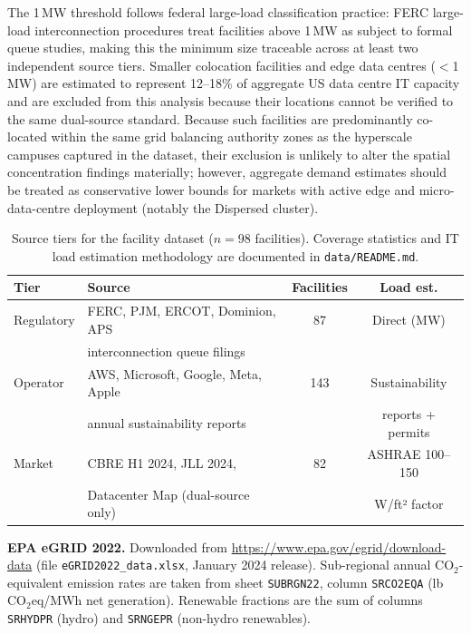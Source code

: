 \documentclass[preprint,12pt]{elsarticle}
\begin{document}
The 1\,MW threshold follows federal large-load classification practice: FERC
large-load interconnection procedures treat facilities above 1\,MW as subject
to formal queue studies, making this the minimum size traceable across at least
two independent source tiers. Smaller colocation facilities and edge data
centres ($<$1\,MW) are estimated to represent 12--18\% of aggregate US data
centre IT capacity \cite{shehabi2024lbnl} and are excluded from this analysis
because their locations cannot be verified to the same dual-source standard.
Because such facilities are predominantly co-located within the same grid
balancing authority zones as the hyperscale campuses captured in the dataset,
their exclusion is unlikely to alter the spatial concentration findings
materially; however, aggregate demand estimates should be treated as
conservative lower bounds for markets with active edge and micro-data-centre
deployment (notably the Dispersed cluster).

\begin{table}[htbp]
\centering
\caption{Source tiers for the facility dataset ($n=98$ facilities).
Coverage statistics and IT load estimation methodology are documented
in \texttt{data/README.md}.}
\label{tab:dataset_tiers}
\small
\begin{tabular}{@{}p{2.2cm}p{5.2cm}cc@{}}
\toprule
\textbf{Tier} & \textbf{Source} & \textbf{Facilities} & \textbf{Load est.} \\
\midrule
Regulatory & FERC, PJM, ERCOT, Dominion, APS & 87 & Direct (MW) \\
            & interconnection queue filings & & \\
Operator   & AWS, Microsoft, Google, Meta, Apple & 143 & Sustainability \\
           & annual sustainability reports & & reports + permits \\
Market     & CBRE H1 2024, JLL 2024, & 82 & ASHRAE 100–150 \\
           & Datacenter Map (dual-source only) & & W/ft² factor \\
\bottomrule
\end{tabular}
\end{table}

\textbf{EPA eGRID 2022.} Downloaded from \url{https://www.epa.gov/egrid/download-data}
(file \texttt{eGRID2022\_data.xlsx}, January 2024 release). Sub-regional
annual CO$_2$-equivalent emission rates are taken from sheet \texttt{SUBRGN22},
column \texttt{SRCO2EQA} (lb CO$_2$eq/MWh net generation). Renewable fractions
are the sum of columns \texttt{SRHYDPR} (hydro) and \texttt{SRNGEPR}
(non-hydro renewables).
\end{document}
